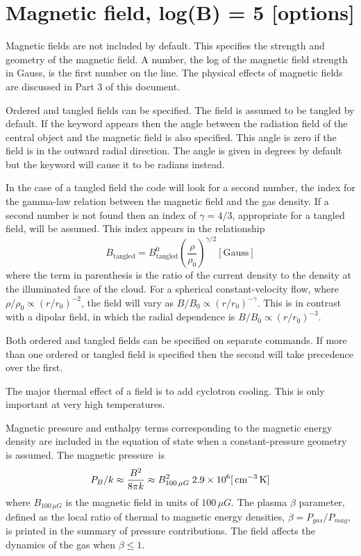 \section{Magnetic field, log(B) = 5 [options]}

Magnetic fields are not included by default.
This specifies the strength
and geometry of the magnetic field.
A number, the log of the magnetic field
strength in Gauss, is the first number on the line.
The physical effects
of magnetic fields are discussed in Part 3 of this document.

Ordered and tangled fields can be specified.
The field is assumed to
be tangled by default.
If the keyword  appears then the angle between
the radiation field of the central object and the magnetic field
is also specified.
This angle is zero if the field is in the outward radial
direction.
The angle is given in degrees by default but the
 keyword
will cause it to be radians instead.

In the case of a tangled field the code will look for a second number,
the index for the gamma-law relation between the magnetic field and the
gas density.
If a second number is not found then an index of $\gamma = 4/3$,
appropriate for a tangled field, will be assumed.
This index appears in the relationship
\begin{equation}
B_{{\mathrm{tangled}}}  = B_{{\mathrm{tangled}}}^0 \left( {\frac{\rho }{{\rho _0
}}} \right)^{\gamma /2}
 [\mathrm{Gauss}]
\end{equation}
where the term in parenthesis is the ratio of the current density to the
density at the illuminated face of the cloud.
For a spherical
constant-velocity flow, where ${\rho /\rho _0 }\propto(r/r_0 )^{-2} $, the
field will vary as  $B/B_0\propto( r/r_0 )^{-\gamma }$.
This is in contrast with a dipolar field,
in which the radial dependence
is $B/B_0 \propto( r /r_0 )^{-3}$.

Both ordered and tangled fields can be specified on separate commands.
If more than one ordered or tangled field is specified then the second
will take precedence over the first.

The major thermal effect of a field is to add cyclotron cooling.
This is only important at very high temperatures.

Magnetic pressure and enthalpy terms corresponding to the magnetic energy
density are included in the equation of state when a constant-pressure
geometry is assumed.
The magnetic pressure~is
\begin{equation}
P_B /k \approx \frac{{B^2 }}{{8\pi k}} \approx B_{100\,\mu G}^2
\;2.9 \times 10^6 [{\rm\thinspace cm^{-3}} {\rm\thinspace K}]
\end{equation}
where $B_{100\,\mu G}$ is
the magnetic field in units of $100\,\mu G$.
The plasma $\beta$ parameter, defined
as the local ratio of thermal to magnetic energy densities,
$\beta  = P_{gas} /P_{mag} $,
is printed in the summary of pressure contributions.
The field affects the dynamics of the gas when $\beta\le 1$.

